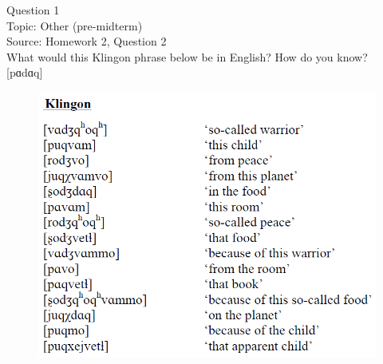 \documentclass[12pt]{article}
\begin{document}
\begin{center}
\textbf{{\color{violet}{\HUGE 20201104 Wednesday\\}}}

\textbf{{\color{violet}{\HUGE ALL EXAMS\\}}}

\end{center}
\newpage

\begin{center}
\textbf{{\color{blue}{\HUGE START OF EXAM\\}}}

\textbf{{\color{blue}{\HUGE Student ID: 44746\\}}}

\textbf{{\color{blue}{\HUGE 4:00\\}}}

\end{center}
\newpage

{\large Question 1}\\

Topic: Other (pre-midterm)\\
Source: Homework 2, Question 2\\

What would this Klingon phrase below be in English? How do you know?\\

{[pɑdɑq]}

\begin{figure}[H]
\includegraphics{../images/klingon.png}
\end{figure}
\end{document}
